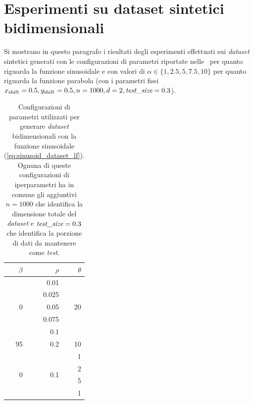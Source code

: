 \section{Esperimenti su dataset sintetici bidimensionali}\label{sec:exp:synth_2d}
Si mostrano in questo paragrafo i risultati degli esperimenti effettuati sui \emph{dataset} sintetici generati con le configurazioni di parametri riportate nelle~ per quanto riguarda la funzione sinusoidale e con valori di $\alpha \in \{1,2.5,5,7.5,10\}$ per quanto riguarda la funzione parabola (con i parametri fissi $x_\text{shift}=0.5, y_\text{shift}=0.5, n=1000, d=2, \emph{test\_size}=0.3$).
\begin{table}
    \centering
    \begin{tabular}{rrr}
        \toprule
         $\beta$ & $\rho$ & $\theta$ \\
        \midrule
        \multirow{5}{*}{0}  & 0.01  & \multirow{5}{*}{20} \\        
                            & 0.025 &     \\        
                            & 0.05  &     \\        
                            & 0.075 &     \\        
                            & 0.1   &     \\
        
        95                  & 0.2   & 10    \\   

        \multirow{4}{*}{0}  & \multirow{4}{*}{0.1}  & 1     \\    
                            &                       & 2     \\    
                            &                       & 5     \\    
                            &                       & 1     \\    
        \bottomrule
    \end{tabular}
    \caption[Configurazioni di parametri utilizzati per generare \emph{dataset} bidimensionali con la funzione sinusoidale.]{Configurazioni di parametri utilizzati per generare \emph{dataset} bidimensionali con la funzione sinusoidale (\ref{eq:sinusoid_dataset_lf}). Ognuna di queste configurazioni di iperparametri ha in comune gli aggiuntivi $n=1000$ che identifica la dimensione totale del \emph{dataset} e $\emph{test\_size}=0.3$ che identifica la porzione di dati da mantenere come \emph{test}.}
    \label{tab:parametri_ds_sin}
\end{table}
